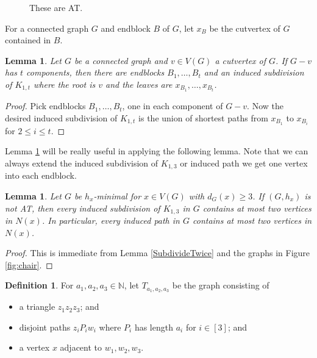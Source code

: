 \documentclass[12pt]{article}
\theoremstyle{plain}
\newtheorem{lem}[thm]{Lemma}
\theoremstyle{definition}
\newtheorem{defn}{Definition}
\theoremstyle{remark}
\newcommand{\IN}{\mathbb{N}}
\newcommand{\irange}[1]{\left[#1\right]}
\begin{document}
\begin{figure}
			\caption{These are AT.}
			\label{fig:thebiggerones}
\end{figure}

For a connected graph $G$ and endblock $B$ of $G$, let $x_B$ be the cutvertex of $G$ contained in $B$.

\begin{lem}\label{InducedPathExists}
	Let $G$ be a connected graph and $v \in V(G)$ a cutvertex of $G$.  If $G-v$ has $t$ components, then there are endblocks $B_1, \ldots, B_t$ and an induced subdivision of $K_{1,t}$ where the root is $v$ and the leaves are $x_{B_1}, \ldots, x_{B_t}$.
\end{lem}
\begin{proof}
	Pick endblocks $B_1, \ldots, B_t$, one in each component of $G-v$.  Now the desired induced subdivision of $K_{1,t}$ is the union of shortest paths from $x_{B_1}$ to $x_{B_i}$ for $2 \le i \le t$. 
\end{proof}

Lemma \ref{InducedPathExists} will be really useful in applying the following lemma.  Note that we can always extend the induced subdivision of $K_{1,3}$ or induced path we get one vertex into each endblock.

\begin{lem}\label{NoClawBusiness}
	Let $G$ be $h_x$-minimal for $x \in V(G)$ with $d_G(x) \ge 3$.  If $(G,h_x)$ is not AT, then every induced subdivision of $K_{1,3}$ in $G$ contains at most two vertices in $N(x)$.  In particular, every induced path in $G$ contains at most two vertices in $N(x)$.
\end{lem}
\begin{proof}
	This is immediate from Lemma \ref{SubdivideTwice} and the graphs in Figure \ref{fig:chair}.
\end{proof}

\begin{defn}
	For $a_1, a_2, a_3 \in \IN$, let $T_{a_1, a_2, a_3}$ be the graph consisting of
	\begin{itemize}
		\item a triangle $z_1z_2z_3$; and
		\item disjoint paths $z_iP_iw_i$ where $P_i$ has length $a_i$ for $i \in \irange{3}$; and
		\item a vertex $x$ adjacent to $w_1, w_2, w_3$.
	\end{itemize}
\end{defn}
\end{document}
